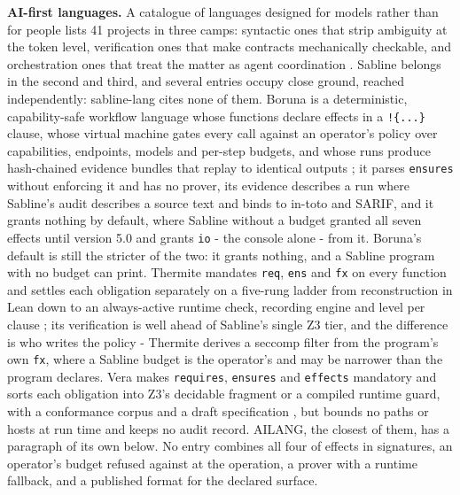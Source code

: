 \documentclass[
]{article}
\newcounter{none} %
\begin{document}
\textbf{AI-first languages.} A catalogue of languages designed for
models rather than for people lists 41 projects in three camps:
syntactic ones that strip ambiguity at the token level, verification
ones that make contracts mechanically checkable, and orchestration ones
that treat the matter as agent coordination \citep{agentlanguages}.
Sabline belongs in the second and third, and several entries occupy
close ground, reached independently: sabline-lang cites none of them.
Boruna is a deterministic, capability-safe workflow language whose
functions declare effects in a \texttt{!\{...\}} clause, whose virtual
machine gates every call against an operator's policy over capabilities,
endpoints, models and per-step budgets, and whose runs produce
hash-chained evidence bundles that replay to identical outputs
\citep{boruna}; it parses \texttt{ensures} without enforcing it and has
no prover, its evidence describes a run where Sabline's audit describes
a source text and binds to in-toto and SARIF, and it grants nothing by
default, where Sabline without a budget granted all seven effects until
version 5.0 and grants \texttt{io} - the console alone - from it.
Boruna's default is still the stricter of the two: it grants nothing,
and a Sabline program with no budget can print. Thermite mandates
\texttt{req}, \texttt{ens} and \texttt{fx} on every function and settles
each obligation separately on a five-rung ladder from reconstruction in
Lean down to an always-active runtime check, recording engine and level
per clause \citep{thermite}; its verification is well ahead of Sabline's
single Z3 tier, and the difference is who writes the policy - Thermite
derives a seccomp filter from the program's own \texttt{fx}, where a
Sabline budget is the operator's and may be narrower than the program
declares. Vera makes \texttt{requires}, \texttt{ensures} and
\texttt{effects} mandatory and sorts each obligation into Z3's decidable
fragment or a compiled runtime guard, with a conformance corpus and a
draft specification \citep{vera}, but bounds no paths or hosts at run
time and keeps no audit record. AILANG, the closest of them, has a
paragraph of its own below. No entry combines all four of effects in
signatures, an operator's budget refused against at the operation, a
prover with a runtime fallback, and a published format for the declared
surface.
\end{document}
